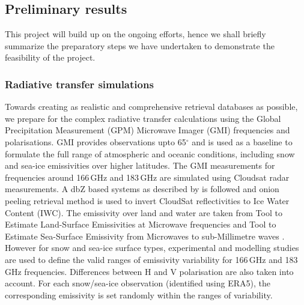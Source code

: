 \documentclass[12pt,oneside,a4paper]{article}
\begin{document}
\subsection{Preliminary results}
%
This project will build up on the ongoing efforts, hence we shall briefly summarize the preparatory steps we have undertaken to demonstrate the feasibility of the project. 

\subsubsection{Radiative transfer simulations}
%
Towards creating as realistic and comprehensive retrieval databases as possible, we prepare for the complex radiative transfer calculations using the Global Precipitation Measurement (GPM) Microwave Imager (GMI) frequencies and polarisations. GMI provides observations upto 65$^{\circ}$ and is used as a baseline to formulate the full range of atmospheric and oceanic conditions, including snow and sea-ice emissivities over higher latitudes. The GMI measurements for frequencies around 166\,GHz and 183\,GHz are simulated using Cloudsat radar measurements. A dbZ based systems as described by \citet{ekelund:using:20} is followed and onion peeling retrieval method is used to invert CloudSat reflectivities to Ice Water Content (IWC). The emissivity over land and water are taken from Tool to Estimate Land-Surface Emissivities at Microwave frequencies \citep{aires} and Tool to Estimate Sea-Surface Emissivity from Microwaves to sub-Millimetre waves \citep{prigent}. However for snow and sea-ice surface types, experimental and modelling studies \citep{harlow:2009:milli, harlow:2012:tundr,hewison:2002:airbo} are used to define the valid ranges of emissivity variability for 166\,GHz and 183 \,GHz frequencies. Differences between H and V polarisation are also taken into account. For each snow/sea-ice observation (identified using ERA5), the corresponding emissivity is set randomly within the ranges of variability.
\end{document}

